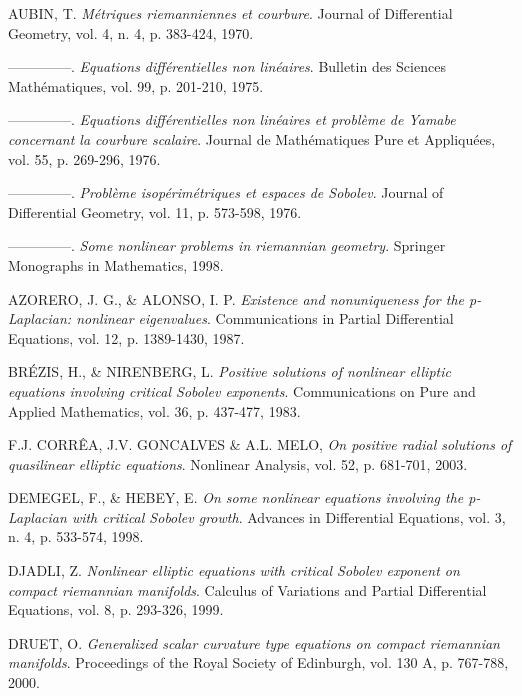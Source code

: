 \documentclass[12pt]{article}
\begin{document}
\begin{thebibliography}{9}


 AUBIN, T. {\it Métriques riemanniennes et courbure}. Journal of Differential Geometry, vol. 4, n. 4, p. 383-424, 1970.

 --------------. {\it Equations différentielles non linéaires}. Bulletin des Sciences Mathématiques, vol. 99, 
p. 201-210, 1975.

 --------------. {\it Equations différentielles non linéaires et problème de Yamabe concernant la 
courbure scalaire}. Journal de Mathématiques Pure et Appliquées, vol. 55, p. 269-296, 1976.

 --------------. {\it Problème isopérimétriques et espaces de Sobolev}. Journal of Differential 
Geometry, vol. 11, p. 573-598, 1976.

 --------------. {\it Some nonlinear problems in riemannian geometry}. Springer Monographs in Mathematics, 1998.

 AZORERO, J. G., \& ALONSO, I. P. {\it Existence and nonuniqueness for the p-Laplacian: nonlinear eigenvalues}. Communications in Partial Differential Equations, vol. 12, p. 1389-1430, 1987.

 BRÉZIS, H., \& NIRENBERG, L. {\it Positive solutions of nonlinear elliptic equations involving critical Sobolev exponents}. Communications on Pure and Applied Mathematics, vol. 36, p. 437-477, 1983.

 F.J. CORR\^EA,  J.V. GONCALVES \& A.L. MELO,  {\it On positive radial solutions of quasilinear elliptic equations}. Nonlinear Analysis, vol. 52, p. 681-701, 2003.

 DEMEGEL, F., \& HEBEY, E. {\it On some nonlinear equations involving the p-Laplacian with critical Sobolev growth}. Advances in Differential Equations, vol. 3, n. 4, p. 533-574, 1998.

 DJADLI, Z. {\it Nonlinear elliptic equations with critical Sobolev exponent on compact riemannian manifolds}. Calculus of Variations and Partial Differential Equations, vol. 8, p. 293-326, 1999.

 DRUET, O. {\it Generalized scalar curvature type equations on compact riemannian manifolds}. Proceedings of the Royal Society of Edinburgh, vol. 130 A, p. 767-788, 2000.


\end{thebibliography}
\end{document}
